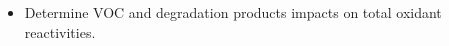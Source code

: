\begin{BlueBox}
    \vskip-1cm
    \begin{block}{}
        \begin{itemize}
            \item Determine VOC and degradation products impacts on total oxidant reactivities.
        \end{itemize}
        \begin{figure}
            \vskip-1cm
            \begin{center}
                \def\svgwidth{\textwidth}
                 \vskip-2cm
            \end{center}
        \end{figure}
    \end{block}
\end{BlueBox}
